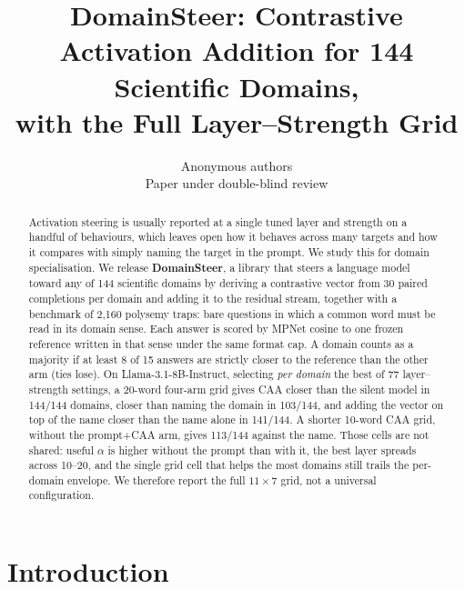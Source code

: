 \documentclass{article} %
\title{DomainSteer: Contrastive Activation Addition for 144 Scientific Domains,\\
with the Full Layer--Strength Grid}
\author{Anonymous authors\\
Paper under double-blind review
}
\begin{document}
\maketitle

\begin{abstract}
Activation steering is usually reported at a single tuned layer and strength on a handful of behaviours, which leaves open how it behaves across many targets and how it compares with simply naming the target in the prompt.
We study this for domain specialisation.
We release \textbf{DomainSteer}, a library that steers a language model toward any of 144 scientific domains by deriving a contrastive vector from 30 paired completions per domain and adding it to the residual stream, together with a benchmark of 2{,}160 polysemy traps: bare questions in which a common word must be read in its domain sense.
Each answer is scored by MPNet cosine to one frozen reference written in that sense under the same format cap.
A domain counts as a majority if at least 8 of 15 answers are strictly closer to the reference than the other arm (ties lose).
On Llama-3.1-8B-Instruct, selecting \emph{per domain} the best of 77 layer--strength settings, a 20-word four-arm grid gives CAA closer than the silent model in 144/144 domains, closer than naming the domain in 103/144, and adding the vector on top of the name closer than the name alone in 141/144.
A shorter 10-word CAA grid, without the prompt+CAA arm, gives 113/144 against the name.
Those cells are not shared: useful $\alpha$ is higher without the prompt than with it, the best layer spreads across 10--20, and the single grid cell that helps the most domains still trails the per-domain envelope.
We therefore report the full $11\times 7$ grid, not a universal configuration.
\end{abstract}

\section{Introduction}
\end{document}
